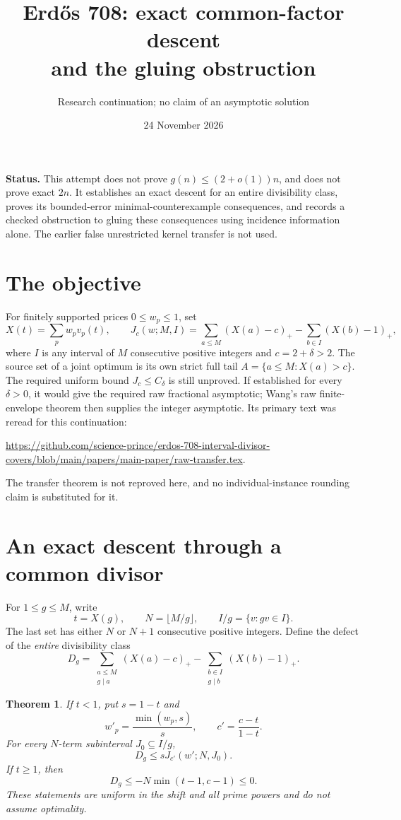 \documentclass[a4paper,11pt]{article}
\title{Erd\H{o}s 708: exact common-factor descent\protect\\and the gluing obstruction}
\author{Research continuation; no claim of an asymptotic solution}
\date{24 November 2026}
\newtheorem{theorem}{Theorem}
\newcommand{\pos}[1]{\left(#1\right)_+}
\begin{document}
\maketitle
\noindent\textbf{Status.} This attempt does not prove $g(n)\le(2+o(1))n$, and does not prove exact $2n$. It establishes an exact descent for an entire divisibility class, proves its bounded-error minimal-counterexample consequences, and records a checked obstruction to gluing these consequences using incidence information alone. The earlier false unrestricted kernel transfer is not used.

\section{The objective}
For finitely supported prices $0\le w_p\le1$, set
\[
 X(t)=\sum_p w_pv_p(t),\qquad
 J_c(w;M,I)=\sum_{a\le M}\pos{X(a)-c}-\sum_{b\in I}\pos{X(b)-1},
\]
where $I$ is any interval of $M$ consecutive positive integers and $c=2+\delta>2$. The source set of a joint optimum is its own strict full tail $A=\{a\le M:X(a)>c\}$.
The required uniform bound $J_c\le C_\delta$ is still unproved. If established for every $\delta>0$, it would give the required raw fractional asymptotic; Wang's raw finite-envelope theorem then supplies the integer asymptotic. Its primary text was reread for this continuation:
\begin{center}\small
\url{https://github.com/science-prince/erdos-708-interval-divisor-covers/blob/main/papers/main-paper/raw-transfer.tex}.
\end{center}
The transfer theorem is not reproved here, and no individual-instance rounding claim is substituted for it.

\section{An exact descent through a common divisor}
For $1\le g\le M$, write
\[
 t=X(g),\qquad N=\lfloor M/g\rfloor,
 \qquad I/g=\{v:gv\in I\}.
\]
The last set has either $N$ or $N+1$ consecutive positive integers. Define the defect of the \emph{entire} divisibility class
\[
 D_g=\sum_{\substack{a\le M\\g\mid a}}\pos{X(a)-c}
 -\sum_{\substack{b\in I\\g\mid b}}\pos{X(b)-1}.
\]

\begin{theorem}\label{thm:descent}
If $t<1$, put $s=1-t$ and
\[
 w'_p=\frac{\min(w_p,s)}s,\qquad c'=\frac{c-t}{1-t}.
\]
For every $N$-term subinterval $J_0\subseteq I/g$,
\begin{equation}\label{eq:descent}
 \boxed{D_g\le sJ_{c'}(w';N,J_0).}
\end{equation}
If $t\ge1$, then
\begin{equation}\label{eq:hot}
 \boxed{D_g\le-N\min(t-1,c-1)\le0.}
\end{equation}
These statements are uniform in the shift and all prime powers and do not assume optimality.
\end{theorem}
\end{document}
